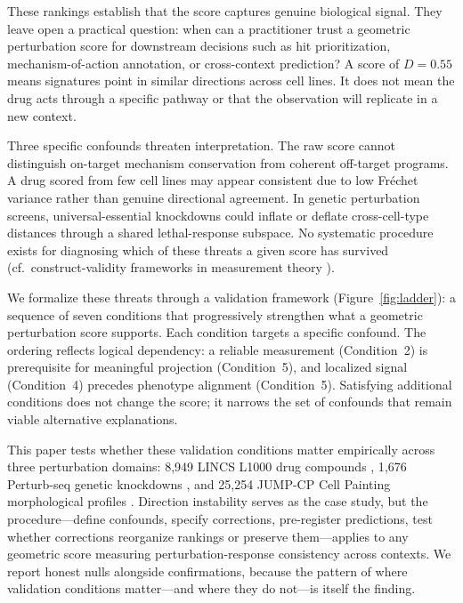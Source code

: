 \documentclass[11pt]{article}
\begin{document}
These rankings establish that the score captures genuine biological signal.
They leave open a practical question: when can a practitioner trust a
geometric perturbation score for downstream decisions such as hit
prioritization, mechanism-of-action annotation, or cross-context
prediction? A score of $D = 0.55$ means signatures point in similar
directions across cell lines. It does not mean the drug acts through a
specific pathway or that the observation will replicate in a new context.

Three specific confounds threaten interpretation. The raw score cannot
distinguish on-target mechanism conservation from coherent off-target
programs. A drug scored from few cell lines may appear consistent due to
low Fr\'echet variance rather than genuine directional agreement. In
genetic perturbation screens, universal-essential knockdowns could inflate
or deflate cross-cell-type distances through a shared lethal-response
subspace. No systematic procedure exists for diagnosing which of these
threats a given score has survived
(cf.\ construct-validity frameworks in measurement theory
\citep{cronbach1955construct,messick1995validity}).

We formalize these threats through a validation framework
(Figure~\ref{fig:ladder}): a sequence of seven conditions that
progressively strengthen what a geometric perturbation score supports.
Each condition targets a specific confound. The ordering reflects logical
dependency: a reliable measurement (Condition~2) is prerequisite for
meaningful projection (Condition~5), and localized signal (Condition~4)
precedes phenotype alignment (Condition~5). Satisfying additional
conditions does not change the score; it narrows the set of confounds
that remain viable alternative explanations.

This paper tests whether these validation conditions matter empirically
across three perturbation domains: 8{,}949 LINCS L1000 drug compounds
\citep{subramanian2017next}, 1{,}676 Perturb-seq genetic knockdowns
\citep{replogle2022mapping}, and 25{,}254 JUMP-CP Cell Painting morphological
profiles \citep{chandrasekaran2023jump}. Direction instability serves as
the case study, but the procedure---define confounds, specify corrections,
pre-register predictions, test whether corrections reorganize rankings or
preserve them---applies to any geometric score measuring
perturbation-response consistency across contexts. We report honest nulls
alongside confirmations, because the pattern of where validation conditions
matter---and where they do not---is itself the finding.
\end{document}
